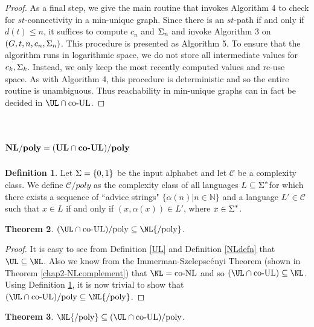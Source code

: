 \documentclass{amsbook}
\newtheorem{theorem}{Theorem}[chapter]
\theoremstyle{definition}
\newtheorem{definition}[theorem]{Definition}
\theoremstyle{remark}
\numberwithin{section}{chapter}
\numberwithin{equation}{chapter}
\newcommand{\boldNL}{\mbox{\rm \bf NL}}
\renewcommand{\coNL}{\mbox{\rm co-NL}}
\newcommand{\boldUL}{\mbox{\rm \bf UL}}
\newcommand{\coUL}{\mbox{\rm co-UL}}
\newcommand{\boldcoUL}{\mbox{\rm \bf co-UL}}
\newcommand{\N}{\mathbb{N}}
\newcommand{\ssum}{\mbox{{\ensuremath{\Sigma}}}}
\newcommand{\NLpoly}{\mbox{\ensuremath{\NL{\rm /poly}}}}
\begin{document}
\begin{proof}
As a final step, we give the main routine that invokes Algorithm 4 to check for $st$-connectivity in a min-unique graph. Since there is an $st$-path if and only if $d(t)\leq n$, it suffices to compute $c_n$ and $\ssum _n$ and invoke Algorithm 3 on $(G,t,n,c_n,\ssum _n)$. This procedure is presented as Algorithm 5. To ensure that the algorithm runs in logarithmic space, we do not store all intermediate values for $c_k,\ssum _k$. Instead, we only keep the most recently computed values and re-use space. As with Algorithm 4, this procedure is deterministic and so the entire routine is unambiguous. Thus reachability in min-unique graphs can in fact be decided in $\UL\cap\coUL$.
\end{proof}

\section{$\boldNL {\rm\bf /poly} =(\boldUL\cap\boldcoUL ){\rm\bf /poly}$}
\begin{definition}\label{nonuniformC}
Let $\ssum =\{ 0,1\}$ be the input alphabet and let $\mathcal{C}$ be a complexity class. We define $\mathcal{C}/poly$ as the complexity class of all languages $L\subseteq\ssum^*$for which there exists a sequence of ``advice strings" $\{\alpha (n)|n\in \N\}$ and a language $L'\in\mathcal{C}$ such that $x\in L$ if and only if $(x,\alpha (x))\in L'$, where $x\in \ssum^*$.
\end{definition}
\begin{theorem}
$(\UL\cap\coUL){\rm /poly}\subseteq \NLpoly$.
\end{theorem}
\begin{proof}
It is easy to see from Definition \ref{UL} and Definition \ref{NLdefn} that $\UL\subseteq\NL$. Also we know from the Immerman-Szelepsc${\rm \acute{e}}$nyi Theorem (shown in Theorem \ref{chap2-NLcomplement}) that $\NL=\coNL$ and so $(\UL\cap\coUL)\subseteq\NL$. Using Definition \ref{nonuniformC}, it is now trivial to show that $(\UL\cap\coUL){\rm /poly}\subseteq \NLpoly$.
\end{proof}
\begin{theorem}
$\NLpoly\subseteq (\UL\cap\coUL){\rm /poly}$.
\end{theorem}
\end{document}
